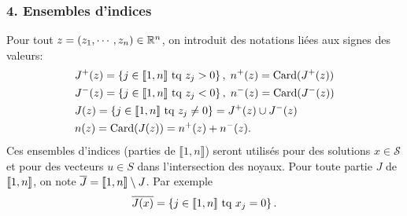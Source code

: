 \subsubsection*{4. Ensembles d'indices}\noindent
Pour tout $z = (z_1, \cdots, z_n) \in \mathbb{R}^n$, on introduit des notations liées aux signes des valeurs:
\[
\begin{aligned}
  &J^+(z) = \left\lbrace j \in \llbracket 1 ,n \rrbracket \text{ tq } z_j > 0\right\rbrace, \; n^+(z) = \operatorname{Card} (J^+(z))\\ 
  &J^-(z) = \left\lbrace j \in \llbracket 1 ,n \rrbracket \text{ tq } z_j < 0\right\rbrace, \; n^-(z) = \operatorname{Card} (J^-(z))\\
  &J(z) = \left\lbrace j \in \llbracket 1 ,n \rrbracket \text{ tq } z_j \neq 0\right\rbrace = J^+(z) \cup J^-(z)\\
  &n(z) = \operatorname{Card} (J(z)) = n^+(z) + n^-(z).
\end{aligned}
\]
Ces ensembles d'indices (parties de $\llbracket 1,n \rrbracket$) seront utilisés pour des solutions $x\in \mathcal{S}$ et pour des vecteurs $u\in S$ dans l'intersection des noyaux.\newline
Pour toute partie $J$ de $\llbracket 1,n\rrbracket$, on note $\overline{J} = \llbracket 1,n\rrbracket \setminus J$. Par exemple 
\[
  \overline{J(x)} = \left\lbrace j \in \llbracket 1,n\rrbracket \text{ tq } x_j = 0\right\rbrace.
\]

\newpage
